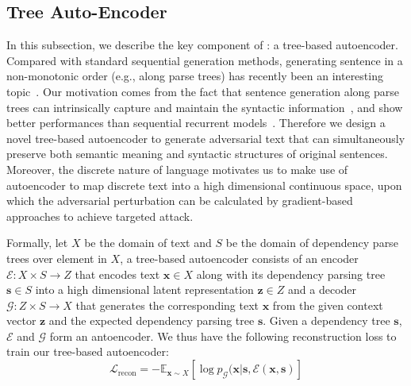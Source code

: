 \subsection{Tree Auto-Encoder} %
In this subsection,  we describe the key component of \advcodec: a tree-based autoencoder.  
Compared with standard sequential generation methods, generating sentence in a non-monotonic order (e.g., along parse trees) has recently been an interesting topic~\citep{Welleck2019NonMonotonicST}.
Our motivation comes from the fact that sentence generation along parse trees can intrinsically capture and maintain the syntactic information~\citep{eriguchi-etal-2017-learning, aharoni-goldberg-2017-towards,Iyyer2018AdversarialEG}, and show better performances than sequential recurrent models~\citep{TreeImportant,Iyyer2014GeneratingSF}. Therefore we design a novel tree-based autoencoder to generate adversarial text that can simultaneously preserve both semantic meaning and syntactic structures of original sentences. Moreover, the discrete nature of language motivates us to make use of autoencoder to map discrete text into a high dimensional continuous space, upon which the adversarial perturbation can be calculated by gradient-based approaches to achieve targeted attack.  

Formally, let $X$ be the domain of text and $S$ be the domain of dependency parse trees over element in $X$, a tree-based autoencoder consists of an encoder $\mathcal{E}: X \times S \rightarrow Z $ that encodes text $\boldsymbol{x} \in X$ along with its dependency parsing tree  $\boldsymbol{s} \in S$ into a high dimensional latent representation $\boldsymbol{z} \in Z$ and a decoder $\mathcal{G}: Z \times S \rightarrow X$ that generates the corresponding text $\boldsymbol{x}$ from the given context vector $\boldsymbol{z}$ and the expected dependency parsing tree $\boldsymbol{s}$. Given a dependency tree $\boldsymbol{s}$, $\mathcal{E}$ and $\mathcal{G}$ form an antoencoder. We thus have the following reconstruction loss to train our tree-based autoencoder:
\begin{equation}
  \mathcal{L}_\text{recon} = - \mathbb{E}_{\boldsymbol{x}\sim X}[\log p_{\mathcal{G}}(\boldsymbol{x}|\boldsymbol{s}, \mathcal{E}(\boldsymbol{x}, \boldsymbol{s})]
\end{equation}

